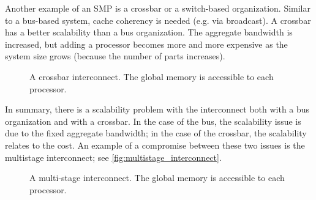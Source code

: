Another example of an SMP is a crossbar or a switch-based organization. Similar
to a bus-based system, cache coherency is needed (e.g. via broadcast). A
crossbar has a better scalability than a bus organization. The aggregate
bandwidth is increased, but adding a processor becomes more and more expensive
as the system size grows (because the number of parts increases).

\begin{figure}
  \centering
  
  \caption{
    A crossbar interconnect. The global memory is accessible to each processor.
  }
  \label{fig:crossbar}
\end{figure}

In summary, there is a scalability problem with the interconnect both with a bus
organization and with a crossbar. In the case of the bus, the scalability issue
is due to the fixed aggregate bandwidth; in the case of the crossbar, the
scalability relates to the cost. An example of a compromise between these two
issues is the multistage interconnect; see
\autoref{fig:multistage_interconnect}.

\begin{figure}
  \centering
  \caption{
    A multi-stage interconnect. The global memory is accessible to each processor.
  }
  \label{fig:multistage_interconnect}
\end{figure}

